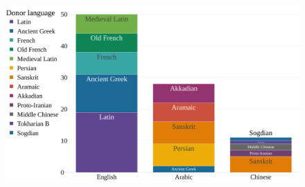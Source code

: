 \begin{figure}[!ht]
  \centering
  \includegraphics[width=\linewidth]{imgs/plots/donor_bar.pdf}
  \caption{}
  \label{fig:donor_bar}
\end{figure}







                                                
                                                        
